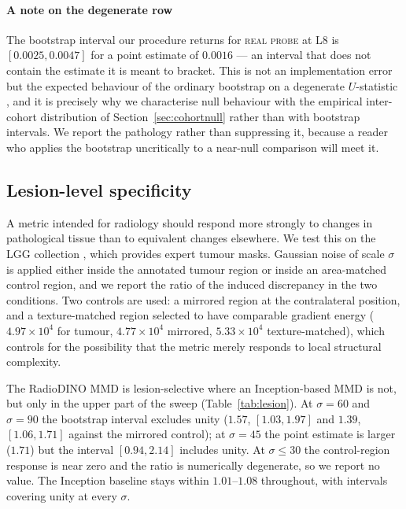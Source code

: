 \documentclass[preprint,12pt,authoryear]{elsarticle}
\newcommand{\Lb}[1]{\ensuremath{\mathrm{L}#1}}
\begin{document}
\paragraph{A note on the degenerate row}
The bootstrap interval our procedure returns for \textsc{real probe} at \Lb{8}
is $[0.0025, 0.0047]$ for a point estimate of $0.0016$ --- an interval that does
not contain the estimate it is meant to bracket. This is not an implementation
error but the expected behaviour of the ordinary bootstrap on a degenerate
$U$-statistic \citep{arcones1992bootstrap}, and it is precisely why we
characterise null behaviour with the empirical inter-cohort distribution of
Section~\ref{sec:cohortnull} rather than with bootstrap intervals. We report the
pathology rather than suppressing it, because a reader who applies the
bootstrap uncritically to a near-null comparison will meet it.

\subsection{Lesion-level specificity}
\label{sec:res_lesion}

A metric intended for radiology should respond more strongly to changes in
pathological tissue than to equivalent changes elsewhere. We test this on the
LGG collection \citep{buda2019association}, which provides expert tumour masks.
Gaussian noise of scale $\sigma$ is applied either inside the annotated tumour
region or inside an area-matched control region, and we report the ratio of the
induced discrepancy in the two conditions. Two controls are used: a mirrored
region at the contralateral position, and a texture-matched region selected to
have comparable gradient energy ($4.97\times10^{4}$ for tumour,
$4.77\times10^{4}$ mirrored, $5.33\times10^{4}$ texture-matched), which
controls for the possibility that the metric merely responds to local
structural complexity.

The RadioDINO MMD is lesion-selective where an Inception-based MMD is not, but
only in the upper part of the sweep (Table~\ref{tab:lesion}). At $\sigma = 60$
and $\sigma = 90$ the bootstrap interval excludes unity ($1.57$,
$[1.03, 1.97]$ and $1.39$, $[1.06, 1.71]$ against the mirrored control); at
$\sigma = 45$ the point estimate is larger ($1.71$) but the interval
$[0.94, 2.14]$ includes unity. At $\sigma \le 30$ the control-region response is
near zero and the ratio is numerically degenerate, so we report no value. The
Inception baseline stays within $1.01$--$1.08$ throughout, with intervals
covering unity at every $\sigma$.
\end{document}
